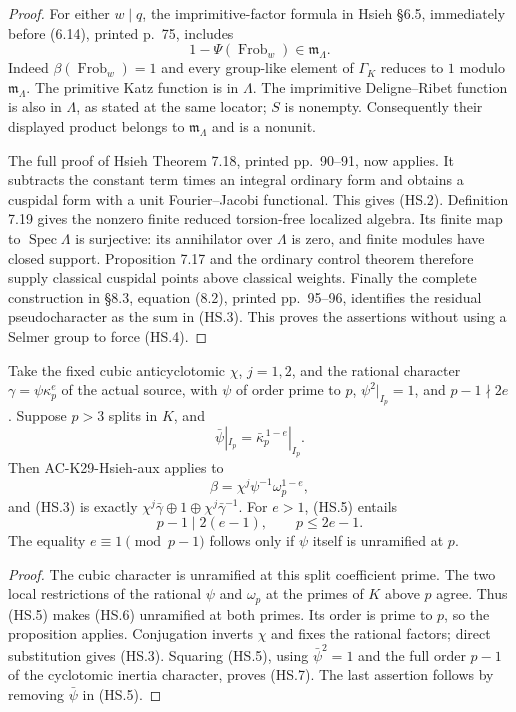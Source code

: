 \begin{proof}
For either $w\mid q$, the imprimitive-factor formula
in Hsieh \S6.5, immediately before (6.14), printed
p.~75, includes
\[
               1-\Psi(\operatorname{Frob}_w)
                        \in\mathfrak m_\Lambda.             \tag{HS.4}
\]
Indeed $\beta(\operatorname{Frob}_w)=1$ and every
group-like element of $\Gamma_K$ reduces to $1$
modulo $\mathfrak m_\Lambda$.
The primitive Katz function is in $\Lambda$.
The imprimitive Deligne--Ribet function is also in
$\Lambda$, as stated at the same locator; $S$ is
nonempty.  Consequently their displayed product
belongs to $\mathfrak m_\Lambda$ and is a nonunit.

The full proof of Hsieh Theorem 7.18, printed
pp.~90--91, now applies.  It subtracts the constant
term times an integral ordinary form and obtains a
cuspidal form with a unit Fourier--Jacobi functional.
This gives (HS.2).  Definition 7.19 gives the
nonzero finite reduced torsion-free localized algebra.
Its finite map to $\operatorname{Spec}\Lambda$ is
surjective: its annihilator over $\Lambda$ is zero,
and finite modules have closed support.
Proposition 7.17 and the ordinary control theorem
therefore supply classical cuspidal points above
classical weights.  Finally the complete construction
in \S8.3, equation (8.2), printed pp.~95--96,
identifies the residual pseudocharacter as the sum
in (HS.3).  This proves the assertions without using
a Selmer group to force (HS.4).
\end{proof}

\begin{corollary}
\label{AC-K29-Hsieh-branch}
Take the fixed cubic anticyclotomic $\chi$, $j=1,2$,
and the rational character $\gamma=\psi\kappa_p^e$
of the actual source, with $\psi$ of order prime to
$p$, $\psi^2|_{I_p}=1$, and
$p-1\nmid2e$.  Suppose $p>3$ splits in $K$, and
\[
       \bar\psi|_{I_p}=\bar\kappa_p^{\,1-e}|_{I_p}.
                                                               \tag{HS.5}
\]
Then AC-K29-Hsieh-aux applies to
\[
                  \beta=\chi^j\psi^{-1}\omega_p^{1-e},       \tag{HS.6}
\]
and (HS.3) is exactly
$\chi^j\bar\gamma\oplus1\oplus
\chi^j\bar\gamma^{-1}$.
For $e>1$, (HS.5) entails
\[
                         p-1\mid2(e-1),\qquad p\le2e-1.     \tag{HS.7}
\]
The equality $e\equiv1\pmod{p-1}$ follows only if
$\psi$ itself is unramified at $p$.
\end{corollary}
\begin{proof}
The cubic character is unramified at this split
coefficient prime.  The two local restrictions of
the rational $\psi$ and $\omega_p$ at the primes of
$K$ above $p$ agree.  Thus (HS.5) makes (HS.6)
unramified at both primes.  Its order is prime to
$p$, so the proposition applies.
Conjugation inverts $\chi$ and fixes the rational
factors; direct substitution gives (HS.3).
Squaring (HS.5), using $\bar\psi^2=1$ and the full
order $p-1$ of the cyclotomic inertia character,
proves (HS.7).  The last assertion follows by
removing $\bar\psi$ in (HS.5).
\end{proof}

